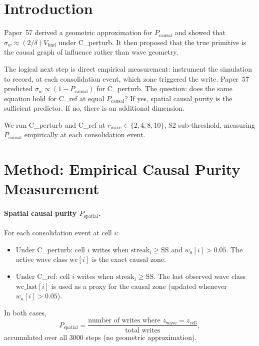 \documentclass[11pt,a4paper]{article}
\newcommand{\Pcausal}{P_{\mathrm{causal}}}
\newcommand{\Psp}{P_{\mathrm{spatial}}}
\begin{document}
\section{Introduction}

Paper~57 derived a geometric approximation for $\Pcausal$ and showed that
$\sigma_w \approx (2/\delta) V_\mathrm{bnd}$ under C\_perturb.
It then proposed that the true primitive is the causal graph of influence
rather than wave geometry.

The logical next step is direct empirical measurement: instrument the simulation
to record, at each consolidation event, which zone triggered the write.
Paper~57 predicted $\sigma_w \propto (1-\Pcausal)$ for C\_perturb.
The question: does the same equation hold for C\_ref at equal $\Pcausal$?
If yes, spatial causal purity is the sufficient predictor.
If no, there is an additional dimension.

We run C\_perturb and C\_ref at $r_\mathrm{wave} \in \{2,4,8,10\}$, S2 sub-threshold,
measuring $\Pcausal$ empirically at each consolidation event.

\section{Method: Empirical Causal Purity Measurement}

\paragraph{Spatial causal purity $\Psp$.}
For each consolidation event at cell $i$:
\begin{itemize}
  \item Under C\_perturb: cell $i$ writes when $\mathrm{streak}_i \geq \mathrm{SS}$
    and $w_a[i] > 0.05$. The active wave class $\mathrm{wc}[i]$ is the exact causal zone.
  \item Under C\_ref: cell $i$ writes when $\mathrm{streak}_i \geq \mathrm{SS}$.
    The last observed wave class $\mathrm{wc\_last}[i]$ is used as a proxy for the
    causal zone (updated whenever $w_a[i] > 0.05$).
\end{itemize}
In both cases,
\begin{equation}
  \Psp = \frac{\text{number of writes where } z_\mathrm{wave} = z_\mathrm{cell}}
             {\text{total writes}},
\end{equation}
accumulated over all 3000 steps (no geometric approximation).
\end{document}
